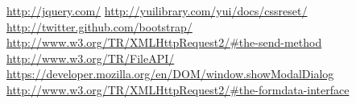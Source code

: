 \documentclass[10pt,a4paper]{article}
\begin{document}
\begin{thebibliography}{9}
    \url{http://jquery.com/}
    \url{http://yuilibrary.com/yui/docs/cssreset/}
    \url{http://twitter.github.com/bootstrap/}
    \url{http://www.w3.org/TR/XMLHttpRequest2/#the-send-method}
    \url{http://www.w3.org/TR/FileAPI/}
    \url{https://developer.mozilla.org/en/DOM/window.showModalDialog}
    \url{http://www.w3.org/TR/XMLHttpRequest2/#the-formdata-interface}
\end{thebibliography}
\end{document}
